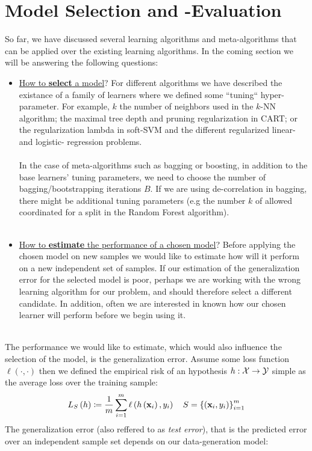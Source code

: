 \section{Model Selection and -Evaluation}
So far, we have discussed several learning algorithms and meta-algorithms that can be applied over the existing learning algorithms. In the coming section we will be answering the following questions:\\
\begin{itemize}
	\item \underline{How to \textbf{select} a model}? For different algorithms we have described the existance of a family of learners where we defined some ``tuning`` hyper-parameter. For example, $k$ the number of neighbors used in the $k$-NN algorithm; the maximal tree depth and pruning regularization in CART; or the regularization lambda in soft-SVM and the different regularized linear- and logistic- regression problems.
	\\~\\
	In the case of meta-algorithms such as bagging or boosting, in addition to the base learners' tuning parameters, we need to choose the number of bagging/bootstrapping iterations $B$. If we are using de-correlation in bagging, there might be additional tuning parameters (e.g the number $k$ of allowed coordinated for a split in the Random Forest algorithm).\\~\\
	\item \underline{How to \textbf{estimate} the performance of a chosen model}? Before applying the chosen model on new samples we would like to estimate how will it perform on a new independent set of samples. If our estimation of the generalization error for the selected model is poor, perhaps we are working with the wrong learning algorithm for our problem, and should therefore select a different candidate. In addition, often we are interested in known how our chosen learner will perform before we begin using it.
\end{itemize}
~\\The performance we would like to estimate, which would also influence the selection of the model, is the generalization error. Assume some loss function $\ell\left(\cdot,\cdot\right)$ then we defined the empirical risk of an hypothesis $h:\mathcal{X}\rightarrow\mathcal{Y}$ simple as the average loss over the training sample: $$ L_S\left(h\right)\coloneqq\frac{1}{m}\sum^m_{i=1}\ell\left(h\left(\mathbf{x}_i\right),y_i\right)\quad S=\left\{\left(\mathbf{x}_i,y_i\right)\right\}^m_{i=1}$$
The generalization error (also reffered to as \textit{test error}), that is the predicted error over an independent sample set depends on our data-generation model:
